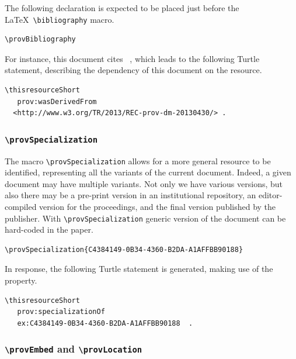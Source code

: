 \documentclass{sigplanconf}
\newcommand{\provstyMacro}[1]{{\tt \textbackslash prov{#1}}\xspace}
\newcommand{\latexMacro}[1]{{\tt \textbackslash#1}\xspace}
\begin{document}
The following declaration is expected to be placed just before the
\LaTeX\ \latexMacro{bibliography} macro.

{\footnotesize
\begin{Verbatim}
\provBibliography
\end{Verbatim}
}

For instance, this document cites
\PROVDM~\cite{Moreau:prov-dm:20130430}, which leads to the following
Turtle statement, describing the dependency of this document on the \PROVDM resource.

{\footnotesize
\begin{Verbatim}[commandchars=\\\{\}]
\thisresourceShort
   prov:wasDerivedFrom
  <http://www.w3.org/TR/2013/REC-prov-dm-20130430/> . 
\end{Verbatim}
}



\subsubsection{\provstyMacro{Specialization}}\label{specialization:macro}

The macro \provstyMacro{Specialization} allows for a more general resource to be identified, representing all the variants of the current document.
Indeed, a given document may have multiple variants.  Not only we have various versions, but also there may be a pre-print version in an institutional repository, an editor-compiled version for the proceedings, and the final version published by the publisher. With \provstyMacro{Specialization}  generic version of the document can be hard-coded in the paper.

{\footnotesize
\begin{Verbatim}
\provSpecialization{C4384149-0B34-4360-B2DA-A1AFFBB90188}
\end{Verbatim}
}


In response, the following Turtle statement is generated, making use of the  property.

{\footnotesize
\begin{Verbatim}[commandchars=\\\{\}]
\thisresourceShort
   prov:specializationOf
   ex:C4384149-0B34-4360-B2DA-A1AFFBB90188  .
\end{Verbatim}
}


\subsubsection{\provstyMacro{Embed} and \provstyMacro{Location}}
\end{document}

